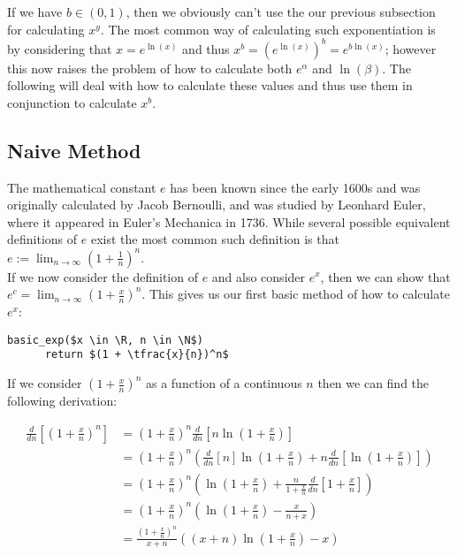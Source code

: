 If we have \(b \in (0, 1)\), then we obviously can't use the our previous subsection for calculating \(x^y\). The most common way of calculating such exponentiation is by considering that \(x = e^{\ln(x)}\) and thus \(x^b = (e^{\ln(x)})^b = e^{b\ln(x)}\); however this now raises the problem of how to calculate both \(e^\alpha\) and \(\ln(\beta)\). The following will deal with how to calculate these values and thus use them in conjunction to calculate \(x^b\).\\

\subsection{Naive Method}

The mathematical constant \(e\) has been known since the early 1600s and was originally calculated by Jacob Bernoulli, and was studied by Leonhard Euler, where it appeared in Euler's Mechanica in 1736. While several possible equivalent definitions of \(e\) exist the most common such definition is that \(e := \lim_{n \to \infty}(1 + \tfrac{1}{n})^n\).\\

If we now consider the definition of \(e\) and also consider \(e^x\), then we can show that \(e^c = \lim_{n\to\infty}(1+\tfrac{x}{n})^n\). This gives us our first basic method of how to calculate \(e^x\):

\begin{lstlisting}[caption={Baisc Method for calculating \(e^x\)},label={PCD_"basic exp"}]
  basic_exp($x \in \R, n \in \N$)
      return $(1 + \tfrac{x}{n})^n$
\end{lstlisting}

If we consider \((1+\tfrac{x}{n})^n\) as a function of a continuous \(n\) then we can find the following derivation:

\begin{align*}
	\frac{d}{dn}\left[(1 + \tfrac{x}{n})^n\right]
		&= (1+\tfrac{x}{n})^n\frac{d}{dn}\left[n\ln(1+\tfrac{x}{n})\right]\\
	&= (1+\tfrac{x}{n})^n\left(\frac{d}{dn}[n]\ln(1+\tfrac{x}{n}) 
		+ n\frac{d}{dn}\left[\ln(1+\tfrac{x}{n})\right]\right)\\
	&=(1+\tfrac{x}{n})^n\left(\ln(1+\tfrac{x}{n}) 
		+ \frac{n}{1 + \tfrac{x}{n}}\frac{d}{dn}[1 + \tfrac{x}{n}]\right)\\
	&=(1+\tfrac{x}{n})^n\left(\ln(1+\tfrac{x}{n}) - \frac{x}{n + x}\right)\\
	&=\frac{(1+\frac{x}{n})^n}{x + n}((x + n)\ln(1 + \tfrac{x}{n}) - x)
\end{align*}

